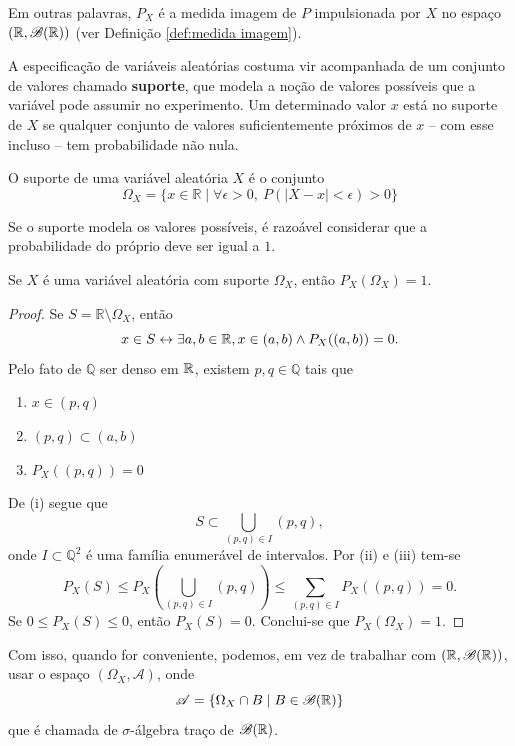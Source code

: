 Em outras palavras, $P_X$ é a medida imagem de $P$ impulsionada por $X$ no espaço
$(\mathbb{R}, \mathcal{B}(\mathbb{R}))$ (ver Definição \ref{def:medida imagem}).

A especificação de variáveis aleatórias costuma vir acompanhada de um conjunto de valores
chamado \textbf{suporte}, que modela a noção de valores possíveis que a variável pode
assumir no experimento.
Um determinado valor $x$ está no suporte de $X$ se qualquer conjunto de valores
suficientemente próximos de $x$ -- com esse incluso -- tem probabilidade não nula.

\begin{def:suporte}
O suporte de uma variável aleatória $X$ é o conjunto
\[
	\Omega_X = \{x \in \mathbb{R} \mid
	\forall \epsilon > 0,\ P(| X - x | < \epsilon) > 0 \}
\]
\end{def:suporte}

Se o suporte modela os valores possíveis, é razoável considerar que a probabilidade
do próprio deve ser igual a $1$.

\begin{thm:prob suporte}
\label{thm:prob suporte}
Se $X$ é uma variável aleatória com suporte $\Omega_X$, então $P_X(\Omega_X) = 1$.
\begin{proof}
	Se $S = \mathbb{R} \setminus \Omega_X$, então
	\[
		x \in S \leftrightarrow \exists a, b \in \mathbb{R}, x \in (a, b) \land P_X((a, b)) = 0.
	\]
	Pelo fato de $\mathbb{Q}$ ser denso em $\mathbb{R}$, existem $p, q \in \mathbb{Q}$ tais
	que
	\begin{enumerate}
		\item[i.] $ x \in (p, q)$
		\item[ii.] $(p, q) \subset (a, b)$
		\item[iii.] $P_X((p, q)) = 0$
	\end{enumerate}
	De (i) segue que
	\[
		S \subset \bigcup_{(p,q) \in I} (p, q),
	\]
	onde $I \subset \mathbb{Q}^2$ é uma família enumerável de intervalos.
	Por (ii) e (iii) tem-se
	\[
		P_X(S) \leq P_X\left(\bigcup_{(p,q) \in I} (p, q)\right) \leq \sum_{(p,q) \in I} P_X((p, q))
		= 0.
	\]
	Se $0 \leq P_X(S) \leq 0$, então $P_X(S) = 0$. Conclui-se que $P_X(\Omega_X) = 1$.
\end{proof}
\end{thm:prob suporte}

Com isso, quando for conveniente, podemos, em vez de trabalhar com $(\mathbb{R}, \mathcal{B}(\mathbb{R}))$,
usar o espaço $(\Omega_X, \mathcal{A})$, onde
\[
	\mathcal{A} = \{\Omega_X \cap B \mid B \in \mathcal{B}(\mathbb{R}) \}
\]
que é chamada de $\sigma$-álgebra traço de $\mathcal{B}(\mathbb{R})$.

